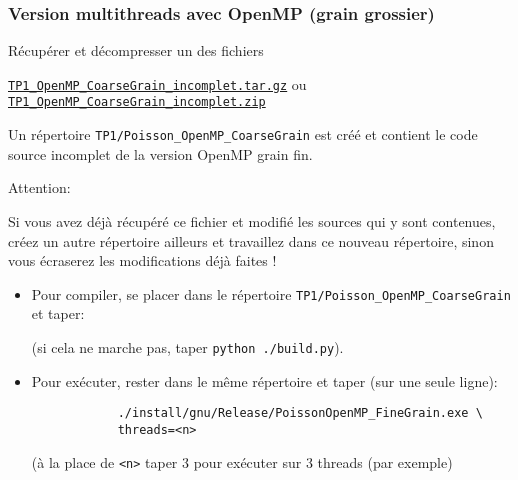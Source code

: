 \documentclass{beamer}
\begin{document}
\begin{frame}[fragile]
	\frametitle{Version multithreads avec OpenMP (grain grossier)}
	
	Récupérer et décompresser un des fichiers \bigskip
	
	\href{https://perso.ensta-paris.fr/~tajchman/Seance3/TP1_OpenMP_FineGrain_incomplet.tar.gz}{\tt TP1\_OpenMP\_CoarseGrain\_incomplet.tar.gz} ou \href{https://perso.ensta-paris.fr/~tajchman/Seance3/TP1_OpenMP_FineGrain_incomplet.zip}{\tt TP1\_OpenMP\_CoarseGrain\_incomplet.zip}
	\bigskip
	
	Un répertoire {\tt TP1/Poisson\_OpenMP\_CoarseGrain} est créé et contient le code source incomplet de la version OpenMP grain fin.
	
	\vfill
	{\color{red}
		Attention:
		\bigskip
		
		\begin{minipage}{\textwidth}\color{red}
			Si vous avez déjà récupéré ce fichier et modifié les sources qui y sont contenues, créez un autre répertoire ailleurs et travaillez dans ce nouveau répertoire, sinon vous écraserez les modifications déjà faites !
		\end{minipage}
	}
	\vfill
\end{frame}

\begin{frame}[fragile]
	
	\begin{itemize}
		\item 	Pour compiler, se placer dans le répertoire {\tt TP1/Poisson\_OpenMP\_CoarseGrain} et taper:
		
		
		\vfill
		(si cela ne marche pas, taper \verb|python ./build.py|).
		
		\vfill
		\item Pour exécuter, rester dans le même répertoire et taper (sur une seule ligne):
		
		\hspace{2cm}
		{\color{blue}\begin{verbatim}
			./install/gnu/Release/PoissonOpenMP_FineGrain.exe \
			threads=<n>
			\end{verbatim}
		}
		
		\vfill
		(à la place de {\tt <n>} taper 3 pour exécuter sur 3 threads (par exemple)
		\vfill
		
	\end{itemize}
\end{frame}
\end{document}
